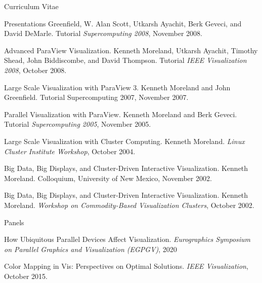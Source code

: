 \documentclass{article}
\begin{document}
\begin{cv}{Curriculum Vitae}
\begin{cvlist}{Presentations}
      Greenfield, W. Alan Scott, Utkarsh Ayachit, Berk Geveci, and David
      DeMarle. Tutorial \emph{Supercomputing 2008}, November 2008.
    \item[Advanced ParaView Visualization.] Kenneth Moreland, Utkarsh
      Ayachit, Timothy Shead, John Biddiscombe, and David
      Thompson. Tutorial \emph{IEEE Visualization 2008}, October 2008.
    \item[Large Scale Visualization with ParaView 3.] Kenneth Moreland and
      John Greenfield. Tutorial Supercomputing 2007, November 2007.
    \item[Parallel Visualization with ParaView.] Kenneth Moreland and Berk
      Geveci. Tutorial \emph{Supercomputing 2005}, November 2005.
    \item[Large Scale Visualization with Cluster Computing.] Kenneth
      Moreland. \emph{Linux Cluster Institute Workshop}, October 2004.
    \item[Big Data, Big Displays, and Cluster-Driven Interactive
      Visualization.] Kenneth Moreland. Colloquium, University of New
      Mexico, November 2002.
    \item[Big Data, Big Displays, and Cluster-Driven Interactive
      Visualization.] Kenneth Moreland. \emph{Workshop on Commodity-Based
      Visualization Clusters}, October 2002.
    \end{cvlist}

    \begin{cvlist}{Panels}
    \item[How Ubiquitous Parallel Devices Affect Visualization.]
      \emph{Eurographics Symposium on Parallel Graphics and Visualization (EGPGV)}, 2020
    \item[Color Mapping in Vis: Perspectives on Optimal Solutions.]
      \emph{IEEE Visualization}, October 2015.
    \end{cvlist}


\end{cv}
\end{document}
